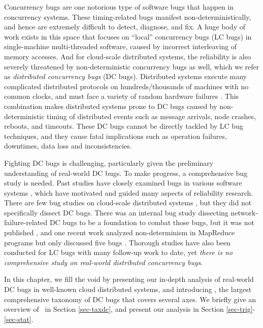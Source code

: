 
Concurrency bugs are one notorious type of software bugs that happen in
concurrency systems. These timing-related bugs manifest non-deterministically,
and hence are extremely difficult to detect, diagnose, and fix. A huge body of
work exists in this space that focuses on ``local'' concurrency bugs (LC bugs)
in single-machine multi-threaded software, caused by incorrect interleaving of
memory accesses. And for cloud-scale distributed systems, the reliability is
also severely threatened by non-deterministic concurrency bugs as well, which
we refer as {\em distributed concurrency bugs} (DC bugs). Distributed systems
execute many complicated distributed protocols on hundreds/thousands of
machines with no common clocks, and must face a variety of random hardware
failures \cite{Do+13-Limplock, Gunawi+14-Cbs}. This combination makes
distributed systems prone to DC bugs caused by non-deterministic timing of
distributed events such as message arrivals, node crashes, reboots, and
timeouts. These DC bugs cannot be directly tackled by LC bug techniques, and
they cause fatal implications such as operation failures, downtimes, data loss
and inconsistencies.

Fighting DC bugs is challenging, particularly given the preliminary
understanding of real-world DC bugs.  To make progress, a comprehensive bug
study is needed. Past studies have closely examined bugs in various software
systems \cite{Chou+01-Empirical, Lu+13-FsEvolution, linux.asplos11}, which have
motivated and guided many aspects of reliability research.
%
There are few bug studies on cloud-scale distributed systems
\cite{Gunawi+14-Cbs, Li+13-ScopeBugStudy}, but they did not specifically dissect
DC bugs. There was an internal bug study dissecting network-failure-related DC
bugs to be a foundation to combat those bugs, but it was not published
\cite{Joshi+13-SetsudoTesting}, and one recent work analyzed non-determinism in
MapReduce programs but only discussed five bugs \cite{Xiao+14-NonDetMR}.
%
Thorough studies have also been conducted for LC bugs \cite{study.dsn10,
Lu+08-ConcurrencyBugStudy} with many follow-up work to date, yet {\em there is
no comprehensive study on real-world distributed concurrency bugs}. 

In this chapter, we fill the void by presenting our in-depth analysis of
real-world DC bugs in well-known cloud distributed systems, and introducing
\taxdc, the largest comprehensive taxonomy of DC bugs that covers several axes.
We briefly give an overview of \taxdc\ in Section \ref{sec-taxdc}, and present
our analysis in Section \ref{sec-trig}-\ref{sec-stat}.

